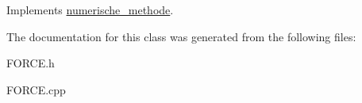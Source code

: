 Implements \hyperlink{classnumerische__methode_af40ea9c1bfbc9d480e7e0d188f2eccf8}{numerische\-\_\-methode}.



The documentation for this class was generated from the following files\-:\begin{DoxyCompactItemize}
\item 
F\-O\-R\-C\-E.\-h\item 
F\-O\-R\-C\-E.\-cpp\end{DoxyCompactItemize}
